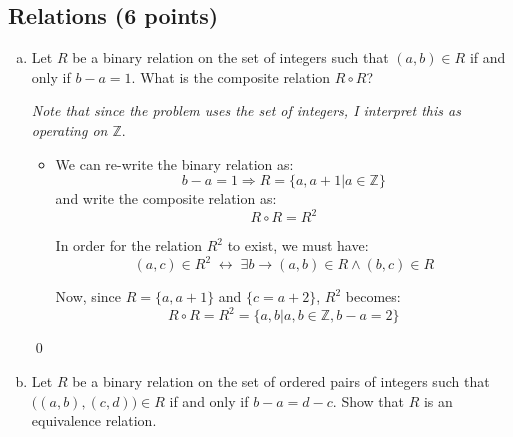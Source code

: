 \documentclass[12pt]{article}
\renewcommand{\iff}{\;\leftrightarrow\;}
\begin{document}
\bigskip
\newpage

\subsection{Relations (6 points)}
\label{sec:relations}

\begin{enumerate}[a)]
\item Let $R$ be a binary relation on the set of integers such that
  $(a,b)\in R$ if and only if $b-a=1$. What is the composite relation
  $R\circ R$?

  \textit{Note that since the problem uses the set of integers, I interpret this as operating on $\mathbb{Z}$}.
  
  \begin{itemize}
  \item We can re-write the binary relation as: \\
    $$
    b - a = 1 \Rightarrow R = \{a,a+1 | a \in \mathbb{Z}\}
    $$
    and write the composite relation as: \\
    $$
    R \circ R = R^2
    $$

    In order for the relation $R^2$ to exist, we must have: 
    $$
    (a,c) \in R^2 \iff \exists b \rightarrow (a,b) \in R \wedge (b,c) \in R
    $$

    Now, since $R = \{a, a+1\}$ and $\{c = a + 2\}$, $R^2$ becomes: \\

    $$
    R \circ R = R^2 = \{a,b | a,b \in \mathbb{Z}, b - a = 2\}
    $$
    
  \end{itemize}
  \qed
  
\medskip

\item Let $R$ be a binary relation on the set of ordered pairs of
  integers such that $\bigl((a,b),(c,d)\bigr)\in R$ if and only if
  $b-a=d-c$. Show that $R$ is an equivalence relation.


\end{enumerate}
\end{document}

